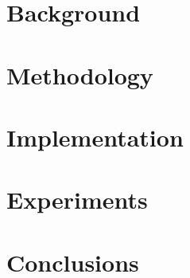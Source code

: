 \documentclass[twoside,11pt]{article}
\begin{document}
\section{Background} \label{sec:background}
\section{Methodology} \label{sec:methodology}
\section{Implementation} \label{sec:implementation}
\section{Experiments} \label{sec:Experiments}
\section{Conclusions} \label{sec:conclusions}


\end{document}
